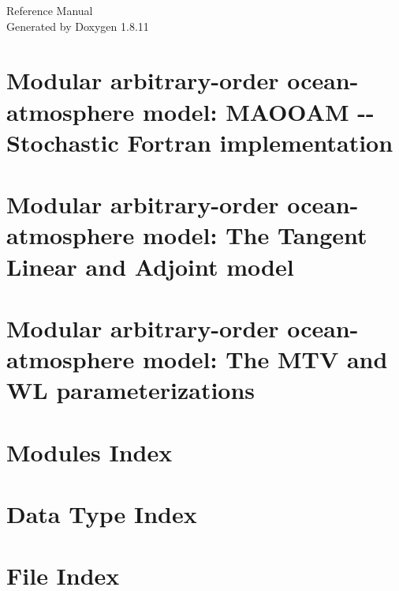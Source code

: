 \documentclass[twoside]{book}
\newcommand{\+}{\discretionary{\mbox{\scriptsize$\hookleftarrow$}}{}{}}
\newcommand{\clearemptydoublepage}{%
  \newpage{\pagestyle{empty}\cleardoublepage}%
}
\begin{document}
\hypersetup{pageanchor=false,
             bookmarksnumbered=true,
             pdfencoding=unicode
            }
\begin{titlepage}
\vspace*{7cm}
\begin{center}%
{\Large Reference Manual}\\
\vspace*{1cm}
{\large Generated by Doxygen 1.8.11}\\
\end{center}
\end{titlepage}
\clearemptydoublepage
\tableofcontents
\clearemptydoublepage
{}
\hypersetup{pageanchor=true}

\chapter{Modular arbitrary-\/order ocean-\/atmosphere model\+: M\+A\+O\+O\+AM -\/-\/ Stochastic Fortran implementation}
\label{index}\hypertarget{index}{}
\chapter{Modular arbitrary-\/order ocean-\/atmosphere model\+: The Tangent Linear and Adjoint model}
\label{md_doc_tl_ad_doc}
\hypertarget{md_doc_tl_ad_doc}{}

\chapter{Modular arbitrary-\/order ocean-\/atmosphere model\+: The M\+TV and WL parameterizations}
\label{md_doc_sto_doc}
\hypertarget{md_doc_sto_doc}{}

\chapter{Modules Index}

\chapter{Data Type Index}

\chapter{File Index}

\end{document}

